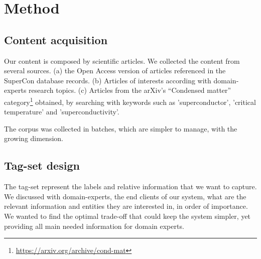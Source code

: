 \documentclass[a4paper,10pt]{article}
\begin{document}




\label{sec:method}
\section{Method}
\subsection{Content acquisition}
Our content is composed by scientific articles. We collected the content from several sources. (a) the Open Access version of articles referenced in the SuperCon database records. (b) Articles of interests according with domain-experts research topics. (c) Articles from the arXiv's “Condensed matter” category\footnote{\url{https://arxiv.org/archive/cond-mat}} obtained, by searching with keywords such as 'superconductor', 'critical temperature' and 'superconductivity'.

The corpus was collected in batches, which are simpler to manage, with the growing dimension. 

\subsection{Tag-set design}
The tag-set represent the labels and relative information that we want to capture. We discussed with domain-experts, the end clients of our system, what are the relevant information and entities they are interested in, in order of importance. We wanted to find the optimal trade-off that could keep the system simpler, yet providing all main needed information for domain experts. 
\end{document}
